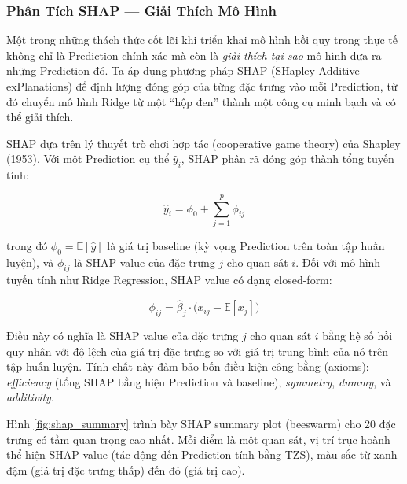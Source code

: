 \subsubsection{Phân Tích SHAP — Giải Thích Mô Hình}
\label{subsec:shap}

Một trong những thách thức cốt lõi khi triển khai mô hình hồi quy trong thực tế không chỉ là Prediction chính xác mà còn là \textit{giải thích tại sao} mô hình đưa ra những Prediction đó. Ta áp dụng phương pháp SHAP (SHapley Additive exPlanations) \cite{lundberg2017unified} để định lượng đóng góp của từng đặc trưng vào mỗi Prediction, từ đó chuyển mô hình Ridge từ một ``hộp đen'' thành một công cụ minh bạch và có thể giải thích.


SHAP dựa trên lý thuyết trò chơi hợp tác (cooperative game theory) của Shapley (1953). Với một Prediction cụ thể $\hat{y}_i$, SHAP phân rã đóng góp thành tổng tuyến tính:

\begin{equation}
    \hat{y}_i = \phi_0 + \sum_{j=1}^{p} \phi_{ij}
\end{equation}

trong đó $\phi_0 = \mathbb{E}[\hat{y}]$ là giá trị baseline (kỳ vọng Prediction trên toàn tập huấn luyện), và $\phi_{ij}$ là SHAP value của đặc trưng $j$ cho quan sát $i$. Đối với mô hình tuyến tính như Ridge Regression, SHAP value có dạng closed-form:

\begin{equation}
    \phi_{ij} = \hat{\beta}_j \cdot \bigl(x_{ij} - \mathbb{E}[x_j]\bigr)
\end{equation}

Điều này có nghĩa là SHAP value của đặc trưng $j$ cho quan sát $i$ bằng hệ số hồi quy nhân với độ lệch của giá trị đặc trưng so với giá trị trung bình của nó trên tập huấn luyện. Tính chất này đảm bảo bốn điều kiện công bằng (axioms): \textit{efficiency} (tổng SHAP bằng hiệu Prediction và baseline), \textit{symmetry}, \textit{dummy}, và \textit{additivity}.


Hình \ref{fig:shap_summary} trình bày SHAP summary plot (beeswarm) cho 20 đặc trưng có tầm quan trọng cao nhất. Mỗi điểm là một quan sát, vị trí trục hoành thể hiện SHAP value (tác động đến Prediction tính bằng TZS), màu sắc từ xanh đậm (giá trị đặc trưng thấp) đến đỏ (giá trị cao).

